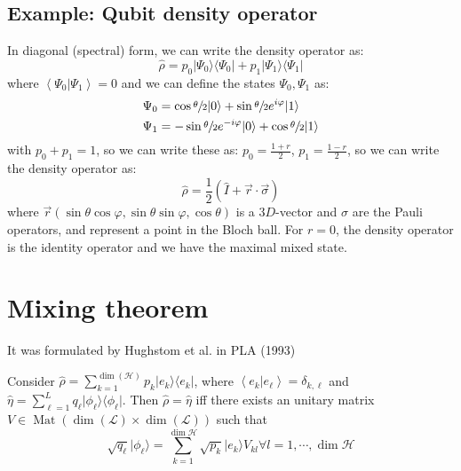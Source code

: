 \documentclass[12pt]{book}
\theoremstyle{definition}
\renewcommand{\v}[1]{\vec{#1}}
\newcommand{\de}{\delta}
\newcommand{\p}{\varphi}
\newcommand{\scalar}[1]{\left\langle {#1}\right\rangle}
\let\oldsum\sum
\renewcommand{\sum}[2]{\oldsum\limits_{#1}^{#2}}
\newcommand{\si}{\sigma}
\newcommand{\para}[1]{\left( {#1} \right)}
\newcommand{\bra}[1]{\langle {#1} \vert}
\newcommand{\ket}[1]{\vert {#1} \rangle}
\DeclareMathOperator{\mat}{Mat}
\begin{document}
\subsection{Example: \textrm{Qubit density operator}}
In diagonal (spectral) form, we can write the density operator as:
\begin{equation*}
  \hat \rho = p_0 \ket{\Psi_0}\bra{\Psi_0} + p_1 \ket{\Psi_1}\bra{\Psi_1}
\end{equation*}
where $\scalar{\Psi_0\vert\Psi_1} = 0$ and we can define the states $\Psi_0, \Psi_1$ as:
\begin{align*}
 \Psi_0 & = \cos\sfrac\theta 2 \ket{0} + \sin \sfrac\theta 2 e^{i\p} \ket{1} \\
 \Psi_1 & = - \sin \sfrac\theta 2 e^{-i\p}\ket{0} + \cos \sfrac\theta 2 \ket{1}
\end{align*}
with $p_0 + p_1 = 1$, so we can write these as: $p_0 = \frac{1 + r}{2}$, $p_1 = \frac{1 - r}{2}$, so we can write the density operator as:
\begin{equation}
  \hat \rho = \frac{1}{2} \para{\hat I + \v r \cdot \v \si}
\end{equation}
where $\v r(\sin\theta \cos\p, \sin\theta \sin\p, \cos\theta)$ is a $3D$-vector and $\si$ are the Pauli operators, and represent a point in the Bloch ball. For $r = 0$, the density operator is the identity operator and we have the maximal mixed state.

\section{Mixing theorem}
It was formulated by Hughstom et al. in PLA (1993)
\begin{tcolorbox}
  Consider $\hat \rho = \sum{k=1}{\dim(\mathcal H)} p_k \ket{e_k}\bra{e_k}$, where $\scalar{e_k \vert e_\ell} = \de_{k, \ell}$ and $\hat \eta = \sum{\ell = 1}{L} q_\ell \ket{\phi_\ell}\bra{\phi_\ell}$.
  Then $\hat \rho = \hat \eta$ iff there exists an unitary matrix $V \in \mat(\dim (\mathcal L) \times \dim(\mathcal L))$ such that
  \begin{equation}
  \sqrt{q_\ell} \ket{\phi_\ell} = \sum{k=1}{\dim \mathcal H} \sqrt{p_k} \ket{e_k} V_{kl} \forall l = 1, \cdots, \dim \mathcal H
  \end{equation}
\end{tcolorbox}
\end{document}
